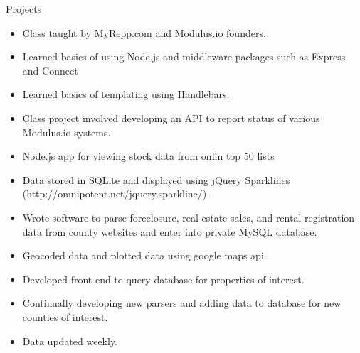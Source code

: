 \begin{category}{Projects}


\begin{itemize}
\item Class taught by MyRepp.com and Modulus.io founders.
\item Learned basics of using Node.js and middleware packages such as Express and Connect
\item Learned basics of templating using Handlebars.
\item Class project involved developing an API to report status of various Modulus.io systems.
\end{itemize}

\ifWebLinks
{}
\else
{} 
\fi

\begin{itemize}
\item Node.js app for viewing stock data from onlin top 50 lists
\item Data stored in SQLite and displayed using jQuery Sparklines (http://omnipotent.net/jquery.sparkline/)
\end{itemize}


\begin{itemize}
\item Wrote software to parse foreclosure, real estate sales, and rental registration data from county websites and enter into private MySQL database.
\item Geocoded data and plotted data using google maps api.
\item Developed front end to query database for properties of interest.
\item Continually developing new parsers and adding data to database for new counties of interest.
\item Data updated weekly.


\end{itemize}
\end{category}
